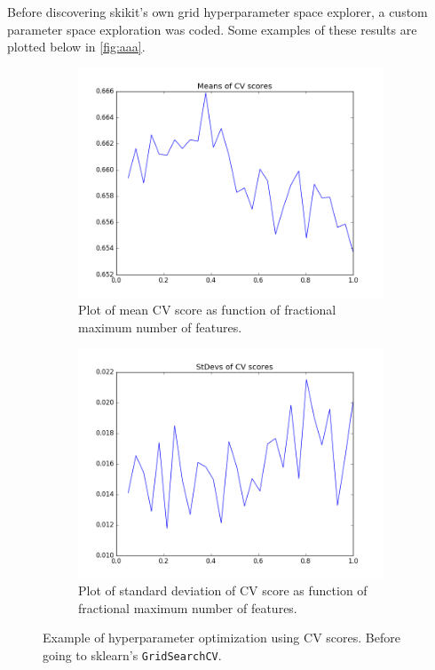 \documentclass[10pt]{article}
\begin{document}
Before discovering skikit's own grid hyperparameter space explorer, a custom parameter space exploration was coded. Some examples of these results are plotted below in \autoref{fig:aaa}.
\begin{figure}[!h]
    \centering
    \begin{subfigure}{0.3\textwidth}
        \centering
        \includegraphics[width=\textwidth]{images/testRFMaxFeatMeans.png}
        \caption{Plot of mean CV score as function of fractional maximum number of features.}
    \end{subfigure}
    \begin{subfigure}{0.3\textwidth}
        \centering
        \includegraphics[width=\textwidth]{images/testRFMaxFeatStDevs.png}
        \caption{Plot of standard deviation of CV score as function of fractional maximum number of features.}
    \end{subfigure}
    \caption{Example of hyperparameter optimization using CV scores. Before going to sklearn's \texttt{GridSearchCV}.}
    \label{fig:aaa}
\end{figure}
\end{document}
